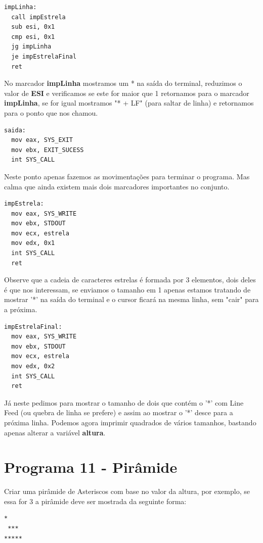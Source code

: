 \begin{lstlisting}[]
impLinha:
  call impEstrela
  sub esi, 0x1
  cmp esi, 0x1
  jg impLinha
  je impEstrelaFinal
  ret
\end{lstlisting}

No marcador \textbf{impLinha} mostramos um * na saída do terminal, reduzimos o valor de \textbf{ESI} e verificamos se este for maior que 1 retornamos para o marcador \textbf{impLinha}, se for igual mostramos "* + LF" (para saltar de linha) e retornamos para o ponto que nos chamou.

\begin{lstlisting}[]
saida:
  mov eax, SYS_EXIT
  mov ebx, EXIT_SUCESS
  int SYS_CALL	
\end{lstlisting}

Neste ponto apenas fazemos as movimentações para terminar o programa. Mas calma que ainda existem mais dois marcadores importantes no conjunto.

\begin{lstlisting}[]
impEstrela:
  mov eax, SYS_WRITE
  mov ebx, STDOUT
  mov ecx, estrela
  mov edx, 0x1
  int SYS_CALL
  ret	
\end{lstlisting}

Observe que a cadeia de caracteres estrelas é formada por 3 elementos, dois deles é que nos interessam, se enviamos o tamanho em 1 apenas estamos tratando de mostrar '*' na saída do terminal e o cursor ficará na mesma linha, sem "cair" para a próxima.

\begin{lstlisting}[]
impEstrelaFinal:
  mov eax, SYS_WRITE
  mov ebx, STDOUT
  mov ecx, estrela
  mov edx, 0x2
  int SYS_CALL
  ret	
\end{lstlisting}

Já neste pedimos para mostrar o tamanho de dois que contém o '*' com Line Feed (ou quebra de linha se prefere) e assim ao mostrar o '*' desce para a próxima linha. Podemos agora imprimir quadrados de vários tamanhos, bastando apenas alterar a variável \textbf{altura}.

\section{Programa 11 - Pirâmide}
Criar uma pirâmide de Asteriscos com base no valor da altura, por exemplo, se essa for 3 a pirâmide deve ser mostrada da seguinte forma:
\begin{lstlisting}[]
  *
 ***
*****
\end{lstlisting}

